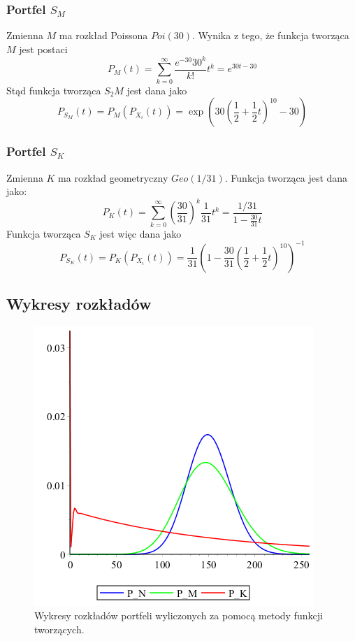 \documentclass[12pt]{article}
\theoremstyle{twierdzenie}
\theoremstyle{definition}
\begin{document}
\subsubsection{Portfel $S_M$}
Zmienna $M$ ma rozkład Poissona $Poi(30)$. Wynika z tego, że funkcja tworząca $M$ jest postaci
$$P_M(t)=\sum_{k=0}^\infty \frac{e^{-30}{30^k}}{k!}t^k=e^{30t-30}$$
Stąd funkcja tworząca $S_2M$ jest dana jako
$$P_{S_M}(t)=P_M(P_{X_i}(t))=\exp\left(30\left(\frac{1}{2}+\frac{1}{2}t\right)^{10}-30\right)$$
\subsubsection{Portfel $S_K$}
Zmienna $K$ ma rozkład geometryczny $Geo(1/31)$. Funkcja tworząca jest dana jako:
$$P_K(t)=\sum_{k=0}^\infty\left(\frac{30}{31}\right)^k\frac{1}{31}t^k=\frac{1/31}{1-\frac{30}{31}t}$$
Funkcja tworząca $S_K$ jest więc dana jako
$$P_{S_K}(t)=P_K(P_{X_i}(t))=\frac{1}{31}\left(1-\frac{30}{31}\left(\frac{1}{2}+\frac{1}{2}t\right)^{10}\right)^{-1}$$
\subsection{Wykresy rozkładów}
\begin{figure}[h]
\begin{center}
\includegraphics[scale=.8]{wykres}
\caption{Wykresy rozkładów portfeli wyliczonych za pomocą metody funkcji tworzących.}
\end{center}


\end{figure}
\end{document}
